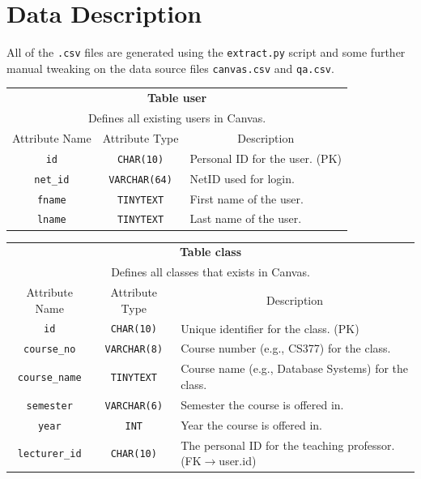 \documentclass{paper}
\begin{document}
	\section{Data Description}
	All of the \verb|.csv| files are generated using the \verb|extract.py| script and some further manual tweaking on the data source files \verb|canvas.csv| and \verb|qa.csv|.
	\begin{center}
		\begin{tabular}{c | c | l}
			\toprule
			\multicolumn{3}{c}{\textbf{Table user}} \\
			\multicolumn{3}{c}{Defines all existing users in Canvas.}\\
			\midrule
			Attribute Name & Attribute Type & \multicolumn{1}{c}{Description} \\
			\verb|id| & \verb|CHAR(10)| & Personal ID for the user. (PK)\\
			\verb|net_id| & \verb|VARCHAR(64)| & NetID used for login. \\
			\verb|fname| & \verb|TINYTEXT| & First name of the user. \\
			\verb|lname| & \verb|TINYTEXT| & Last name of the user. \\
			\bottomrule
		\end{tabular}\vspace{1.5em}
	
		\begin{tabular}{c | c | l}
			\toprule
			\multicolumn{3}{c}{\textbf{Table class}} \\
			\multicolumn{3}{c}{Defines all classes that exists in Canvas.}\\
			\midrule
			Attribute Name & Attribute Type & \multicolumn{1}{c}{Description} \\
			\verb|id| & \verb|CHAR(10)| & Unique identifier for the class. (PK)\\
			\verb|course_no| & \verb|VARCHAR(8)| & Course number (e.g., CS377) for the class.\\
			\verb|course_name| & \verb|TINYTEXT| & Course name (e.g., Database Systems) for the class.\\
			\verb|semester| & \verb|VARCHAR(6)| & Semester the course is offered in.\\
			\verb|year| & \verb|INT| & Year the course is offered in.\\
			\verb|lecturer_id| & \verb|CHAR(10)| & The personal ID for the teaching professor. (FK$\to$user.id)\\
			\bottomrule
		\end{tabular}\vspace{1.5em}


\end{center}
\end{document}
